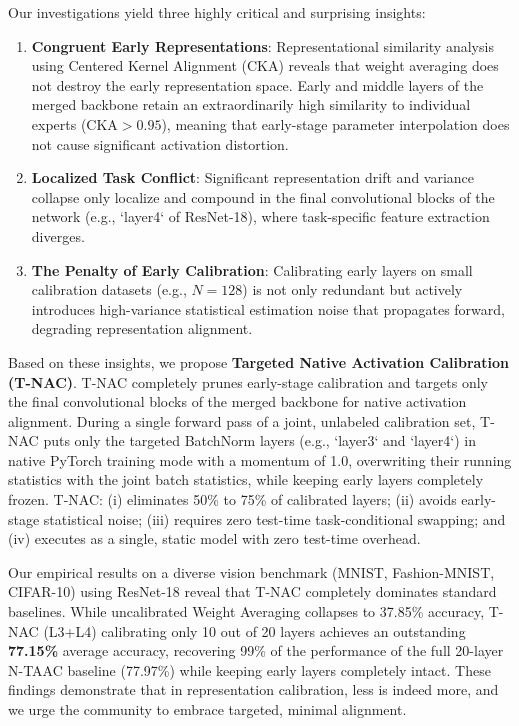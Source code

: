 \documentclass{article}
\theoremstyle{plain}
\theoremstyle{definition}
\begin{document}
Our investigations yield three highly critical and surprising insights:
\begin{enumerate}\setlength{\itemsep}{0pt}\setlength{\parskip}{0pt}
    \item \textbf{Congruent Early Representations}: Representational similarity analysis using Centered Kernel Alignment (CKA) reveals that weight averaging does not destroy the early representation space. Early and middle layers of the merged backbone retain an extraordinarily high similarity to individual experts ($\text{CKA} > 0.95$), meaning that early-stage parameter interpolation does not cause significant activation distortion.
    \item \textbf{Localized Task Conflict}: Significant representation drift and variance collapse only localize and compound in the final convolutional blocks of the network (e.g., `layer4` of ResNet-18), where task-specific feature extraction diverges.
    \item \textbf{The Penalty of Early Calibration}: Calibrating early layers on small calibration datasets (e.g., $N=128$) is not only redundant but actively introduces high-variance statistical estimation noise that propagates forward, degrading representation alignment.
\end{enumerate}

Based on these insights, we propose \textbf{Targeted Native Activation Calibration (T-NAC)}. T-NAC completely prunes early-stage calibration and targets only the final convolutional blocks of the merged backbone for native activation alignment. During a single forward pass of a joint, unlabeled calibration set, T-NAC puts only the targeted BatchNorm layers (e.g., `layer3` and `layer4`) in native PyTorch training mode with a momentum of 1.0, overwriting their running statistics with the joint batch statistics, while keeping early layers completely frozen. T-NAC: (i) eliminates 50\% to 75\% of calibrated layers; (ii) avoids early-stage statistical noise; (iii) requires zero test-time task-conditional swapping; and (iv) executes as a single, static model with zero test-time overhead.

Our empirical results on a diverse vision benchmark (MNIST, Fashion-MNIST, CIFAR-10) using ResNet-18 reveal that T-NAC completely dominates standard baselines. While uncalibrated Weight Averaging collapses to 37.85\% accuracy, T-NAC (L3+L4) calibrating only 10 out of 20 layers achieves an outstanding \textbf{77.15\%} average accuracy, recovering 99\% of the performance of the full 20-layer N-TAAC baseline (77.97\%) while keeping early layers completely intact. These findings demonstrate that in representation calibration, less is indeed more, and we urge the community to embrace targeted, minimal alignment.
\end{document}

